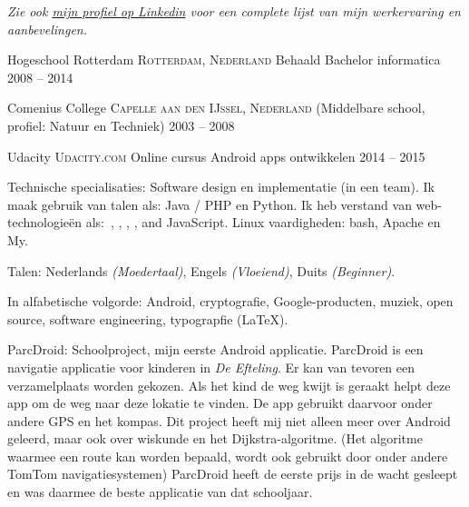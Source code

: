 \documentclass[10pt,a4paper]{article}
\begin{document}
\begin{center}
  \emph{Zie ook \href{http://www.linkedin.com/in/frankkie12345}{mijn profiel op Linkedin} voor een complete lijst van mijn werkervaring en aanbevelingen.}
\end{center}


\spacedhrule{-0.2em}{-0.4em}


\headedsection
  {Hogeschool Rotterdam}
  {\textsc{Rotterdam, Nederland}} {%
  \headedsubsection
    {Behaald Bachelor informatica}
    {2008 -- 2014}
    {}
}

\headedsection
  {Comenius College}
  {\textsc{Capelle aan den IJssel, Nederland}} {%
  \headedsubsection
    { \textnormal{(Middelbare school, profiel: Natuur en Techniek)}}
    {2003 -- 2008} {}
}

\headedsection
  {Udacity}
  {\textsc{Udacity.com}} {
  \headedsection
  { \textnormal{Online cursus Android apps ontwikkelen}}
  {2014 -- 2015} 
  {}
  }

\spacedhrule{0.5em}{-0.4em}


\inlineheadsection  %
  {Technische specialisaties:}
  {Software design en implementatie (in een team). 
  Ik maak gebruik van talen als: Java / PHP en Python. 
  Ik heb verstand van web-technologie\"en als:\ , , , ,  and JavaScript. Linux vaardigheden: bash, Apache en My.}

\inlineheadsection
  {Talen:}
  {Nederlands \emph{(Moedertaal)}, Engels \emph{(Vloeiend)}, Duits \emph{(Beginner)}.}


\spacedhrule{1.6em}{-0.4em}


\inlineheadsection
  {In alfabetische volgorde:}
  {Android, cryptografie, Google-producten, muziek, open source,  software engineering, typograpfie (\LaTeX).}

\spacedhrule{1.6em}{-0.4em}


\inlineheadsection
  {ParcDroid:}
  {Schoolproject, mijn eerste Android applicatie. ParcDroid is een navigatie applicatie voor kinderen in \emph{De Efteling}. Er kan van tevoren een verzamelplaats worden gekozen. Als het kind de weg kwijt is geraakt helpt deze app om de weg naar deze lokatie te vinden. De app gebruikt daarvoor onder andere GPS en het kompas. Dit project heeft mij niet alleen meer over Android geleerd, maar ook over wiskunde en het Dijkstra-algoritme. (Het algoritme waarmee een route kan worden bepaald, wordt ook gebruikt door onder andere TomTom navigatiesystemen) ParcDroid heeft de eerste prijs in de wacht gesleept en was daarmee de beste applicatie van dat schooljaar.}
  
\end{document}
